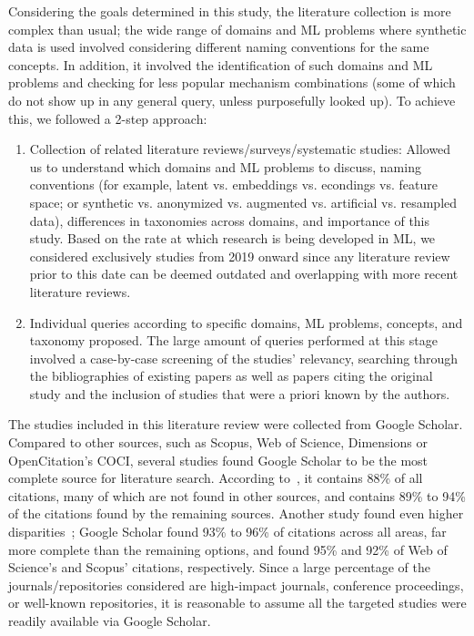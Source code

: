 Considering the goals determined in this study, the literature collection is
more complex than usual; the wide range of domains and ML problems where
synthetic data is used involved considering different naming conventions for
the same concepts. In addition, it involved the identification of such domains
and ML problems and checking for less popular mechanism combinations (some of
which do not show up in any general query, unless purposefully looked up). To
achieve this, we followed a 2-step approach:

\begin{enumerate}

    \item Collection of related literature reviews/surveys/systematic studies:
        Allowed us to understand which domains and ML problems to discuss,
        naming conventions (for example, latent vs. embeddings vs. econdings
        vs. feature space; or synthetic vs. anonymized vs. augmented vs.
        artificial vs. resampled data), differences in taxonomies across
        domains, and importance of this study.  Based on the rate at which
        research is being developed in ML, we considered exclusively studies
        from 2019 onward since any literature review prior to this date can be
        deemed outdated and overlapping with more recent literature reviews.

    \item Individual queries according to specific domains, ML problems,
        concepts, and taxonomy proposed. The large amount of queries performed
        at this stage involved a case-by-case screening of the studies’
        relevancy, searching through the bibliographies of existing papers as
        well as papers citing the original study and the inclusion of studies
        that were a priori known by the authors. 

\end{enumerate}

The studies included in this literature review were collected from Google
Scholar. Compared to other sources, such as Scopus, Web of Science, Dimensions
or OpenCitation’s COCI, several studies found Google Scholar to be the most
complete source for literature search. According
to~\cite{martin2021google},
it contains 88\% of all citations, many of which are not found in other
sources, and contains 89\% to 94\% of the citations found by the remaining
sources. Another study found even higher
disparities~\cite{martin2018google};
Google Scholar found 93\% to 96\% of citations across all areas, far more
complete than the remaining options, and found 95\% and 92\% of Web of
Science's and Scopus' citations, respectively. Since a large percentage of the
journals/repositories considered are high-impact journals, conference
proceedings, or well-known repositories, it is reasonable to assume all the
targeted studies were readily available via Google Scholar.



